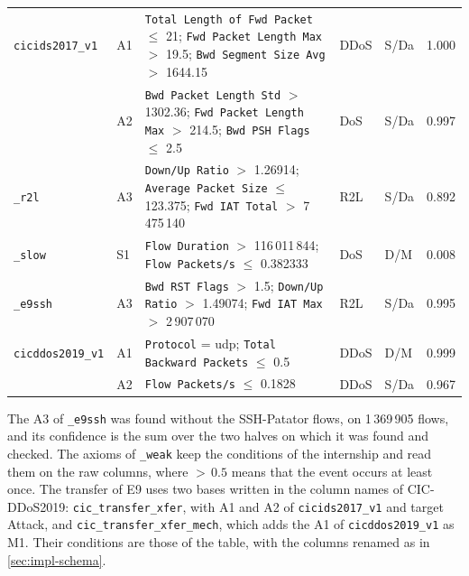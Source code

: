 \begin{table}[htbp]
\begin{tabular}{@{}p{2.9cm}p{0.6cm}p{5.0cm}p{1.0cm}p{1.1cm}p{0.9cm}@{}}
\texttt{cicids2017\_v1} & A1
  & \texttt{Total Length of Fwd Packet} $\le$ 21; \texttt{Fwd Packet Length Max} $>$ 19.5; \texttt{Bwd Segment Size Avg} $>$ 1644.15
  & DDoS & S/Da & 1.000 \\
 & A2
  & \texttt{Bwd Packet Length Std} $>$ 1302.36; \texttt{Fwd Packet Length Max} $>$ 214.5; \texttt{Bwd PSH Flags} $\le$ 2.5
  & DoS & S/Da & 0.997 \\
\texttt{\_r2l} & A3
  & \texttt{Down/Up Ratio} $>$ 1.26914; \texttt{Average Packet Size} $\le$ 123.375; \texttt{Fwd IAT Total} $>$ 7\,475\,140
  & R2L & S/Da & 0.892 \\
\texttt{\_slow} & S1
  & \texttt{Flow Duration} $>$ 116\,011\,844; \texttt{Flow Packets/s} $\le$ 0.382333
  & DoS & D/M & 0.008 \\
\texttt{\_e9ssh} & A3
  & \texttt{Bwd RST Flags} $>$ 1.5; \texttt{Down/Up Ratio} $>$ 1.49074; \texttt{Fwd IAT Max} $>$ 2\,907\,070
  & R2L & S/Da & 0.995 \\
\midrule
\texttt{cicddos2019\_v1} & A1
  & \texttt{Protocol} = udp; \texttt{Total Backward Packets} $\le$ 0.5
  & DDoS & D/M & 0.999 \\
 & A2 & \texttt{Flow Packets/s} $\le$ 0.1828 & DDoS & S/Da & 0.967 \\
\bottomrule
\end{tabular}
\end{table}

The A3 of \texttt{\_e9ssh} was found without the SSH-Patator flows, on 1\,369\,905
flows, and its confidence is the sum over the two halves on which it was found and
checked. The axioms of \texttt{\_weak} keep the conditions of the internship and read
them on the raw columns, where ${>}\,0.5$ means that the event occurs at least once.
The transfer of E9 uses two bases written in the column names of
CIC-DDoS2019: \texttt{cic\_transfer\_xfer}, with A1 and A2 of \texttt{cicids2017\_v1}
and target Attack, and \texttt{cic\_transfer\_xfer\_mech}, which adds the A1 of
\texttt{cicddos2019\_v1} as M1. Their conditions are those of the table, with the columns
renamed as in \cref{sec:impl-schema}.
